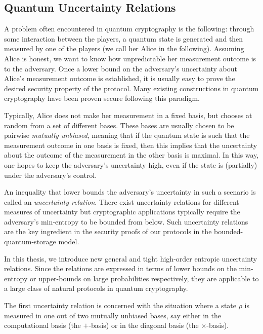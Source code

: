 

\subsection{Quantum Uncertainty Relations}
A problem often encountered in
quantum cryptography is the following:
through some interaction between the players, a quantum state is
generated and then measured by one of the players (we call her Alice
in the following). Assuming Alice is honest, we want to know how
unpredictable her measurement outcome is to the adversary.  Once a
lower bound on the adversary's uncertainty about Alice's measurement
outcome is established, it is usually easy to prove the desired
security property of the protocol. Many existing constructions in
quantum cryptography have been proven secure following this paradigm.

Typically, Alice does not make her measurement in a fixed basis, but
chooses at random from a set of different bases. These bases are
usually chosen to be pairwise {\em {}mutually unbiased}, meaning that if the quantum state is
such that the measurement outcome in one basis is fixed, then this
implies that the uncertainty about the outcome of the measurement in
the other basis is maximal. In this way, one hopes to keep the
adversary's uncertainty high, even if the state is (partially) under
the adversary's control.

An inequality that lower bounds the adversary's uncertainty in such a
scenario is called an {\em uncertainty relation}.  There exist
uncertainty relations for different measures of uncertainty but
cryptographic applications typically require the adversary's
min-entropy to be bounded from below. Such uncertainty relations are
the key ingredient in the security proofs of our protocols in the
bounded-quantum-storage model.

In this thesis, we introduce new general and tight high-order entropic
uncertainty relations. Since the relations are expressed in terms of
lower bounds on the min-entropy or upper-bounds on large probabilities
respectively, they are applicable to a large class of natural
protocols in quantum cryptography.

The first uncertainty relation is concerned with the situation where a
 state $\rho$ is measured in one out of two mutually
unbiased bases, say either in the
computational basis (the $+$-basis) or in
the diagonal basis (the $\times$-basis).

